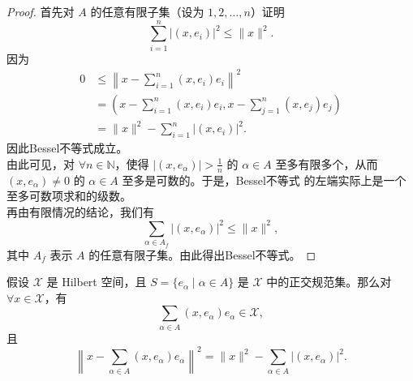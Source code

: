 \documentclass[lang=cn,newtx,10pt,scheme=chinese,thmcnt=chapter]{elegantbook}
\begin{document}
\begin{proof}
首先对 $A$ 的任意有限子集（设为 $1, 2, \dots, n$）证明
\begin{equation}
\sum_{i=1}^n\left|\left(x, e_i\right)\right|^2 \leqslant \|x\|^2. 
\end{equation}
因为
\begin{equation*}
\begin{aligned}
0 &\leqslant \left\|x - \sum_{i=1}^n\left(x, e_i\right)e_i\right\|^2 \\
  &= \left(x - \sum_{i=1}^n\left(x, e_i\right)e_i, x - \sum_{j=1}^n\left(x, e_j\right)e_j\right) \\
  &= \|x\|^2 - \sum_{i=1}^n\left|\left(x, e_i\right)\right|^2.
\end{aligned}
\end{equation*}
因此Bessel不等式成立。\\
由此可见，对 $\forall n \in \mathbb{N}$，使得 $\left|\left(x, e_\alpha\right)\right| > \frac{1}{n}$ 的 $\alpha \in A$ 至多有限多个，从而 $\left(x, e_\alpha\right) \neq 0$ 的 $\alpha \in A$ 至多是可数的。于是，Bessel不等式 的左端实际上是一个至多可数项求和的级数。\\
再由有限情况的结论，我们有
\begin{equation*}
\sum_{\alpha \in A_f}\left|\left(x, e_\alpha\right)\right|^2 \leqslant \|x\|^2,
\end{equation*}
其中 $A_f$ 表示 $A$ 的任意有限子集。由此得出Bessel不等式。
\end{proof}

\begin{corollary}
假设 $\mathscr{X}$ 是 Hilbert 空间，且 $S = \{e_\alpha \mid \alpha \in A\}$ 是 $\mathscr{X}$ 中的正交规范集。那么对 $\forall x \in \mathscr{X}$，有
\begin{equation*}
\sum_{\alpha \in A}\left(x, e_\alpha\right)e_\alpha \in \mathscr{X},
\end{equation*}
且
\begin{equation}
\left\|x - \sum_{\alpha \in A}\left(x, e_\alpha\right)e_\alpha\right\|^2 = \|x\|^2 - \sum_{\alpha \in A}\left|\left(x, e_\alpha\right)\right|^2. 
\end{equation}
\end{corollary}
\end{document}
